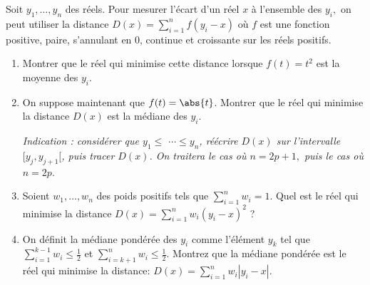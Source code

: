 \documentclass{../headers/td_upc}
\providecommand{\1}{\mathds{1}}
\begin{document}
	\exo{\!\!\!\!*} 
	Soit $y_{1}, \ldots, y_{n}$ des réels. Pour mesurer l'écart d'un réel $x$ 
	à l'ensemble des $y_{i},$ on peut utiliser la distance 
	$D(x)=\sum_{i=1}^{n} f\left(y_{i}-x\right)$ où $f$ est une fonction positive,
	paire, s'annulant en 0, continue et croissante sur les réels positifs.
	\begin{enumerate}
		\item Montrer que le réel qui minimise cette distance lorsque $f(t)=t^{2}$ est la moyenne des $y_{i}$.
		\item On suppose maintenant que $f(t)=\abs{t}$. 
		Montrer que le réel qui minimise la distance $D(x)$ est la médiane des $y_{i}$.
		
		{\it Indication : considérer que $y_{1} \leq$ $\cdots \leq y_{n}$, 
		réécrire $D(x)$ sur l'intervalle $[y_{j}, y_{j+1}[$, puis tracer $D(x)$.
		On traitera le cas où $n=2 p+1,$ puis le cas où $n=2 p$}.
		
		
		\item Soient $w_{1}, \ldots, w_{n}$ des poids positifs tels que $\sum_{i=1}^n w_i = 1$.
		Quel est le réel qui minimise la distance 
		\(
		D(x) = \sum_{i=1}^n w_i (y_i - x)^2
		\) ?
		\item On définit la médiane pondérée des $y_i$ comme l'élément $y_k$ tel que
		\(
		\sum_{i=1}^{k-1} w_i \leq \frac{1}{2}
		\)
		et
		\(
		\sum_{i=k+1}^n w_i \leq \frac{1}{2}.
		\)
		Montrez que la médiane pondérée est le réel qui minimise la distance\;:
		\(
		D(x) = \sum_{i=1}^n w_i |y_i - x|
		\).
	\end{enumerate}
	
\end{document}
